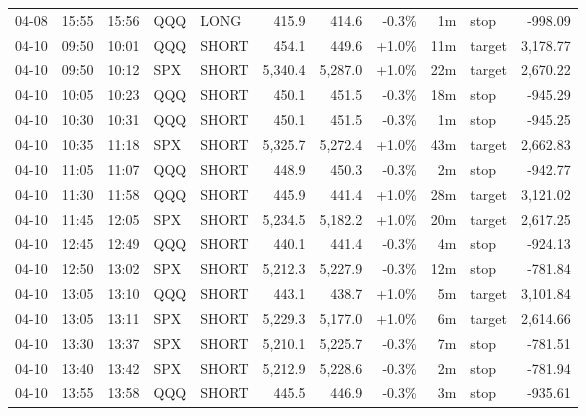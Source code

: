 \documentclass[11pt,a4paper,twoside]{article}
\begin{document}
\begin{center}
\begin{longtable}{>{\color{txtmain}}l l l l l r r r r >{\color{txtmain}}l r}
04-08 & 15:55 & 15:56 & QQQ & LONG & 415.9 & 414.6 & \textcolor{lossred}{-0.3\%} & 1m & stop & \textcolor{lossred}{-998.09} \\
04-10 & 09:50 & 10:01 & QQQ & SHORT & 454.1 & 449.6 & \textcolor{wingreen}{+1.0\%} & 11m & target & \textcolor{wingreen}{3,178.77} \\
04-10 & 09:50 & 10:12 & SPX & SHORT & 5,340.4 & 5,287.0 & \textcolor{wingreen}{+1.0\%} & 22m & target & \textcolor{wingreen}{2,670.22} \\
04-10 & 10:05 & 10:23 & QQQ & SHORT & 450.1 & 451.5 & \textcolor{lossred}{-0.3\%} & 18m & stop & \textcolor{lossred}{-945.29} \\
04-10 & 10:30 & 10:31 & QQQ & SHORT & 450.1 & 451.5 & \textcolor{lossred}{-0.3\%} & 1m & stop & \textcolor{lossred}{-945.25} \\
04-10 & 10:35 & 11:18 & SPX & SHORT & 5,325.7 & 5,272.4 & \textcolor{wingreen}{+1.0\%} & 43m & target & \textcolor{wingreen}{2,662.83} \\
04-10 & 11:05 & 11:07 & QQQ & SHORT & 448.9 & 450.3 & \textcolor{lossred}{-0.3\%} & 2m & stop & \textcolor{lossred}{-942.77} \\
04-10 & 11:30 & 11:58 & QQQ & SHORT & 445.9 & 441.4 & \textcolor{wingreen}{+1.0\%} & 28m & target & \textcolor{wingreen}{3,121.02} \\
04-10 & 11:45 & 12:05 & SPX & SHORT & 5,234.5 & 5,182.2 & \textcolor{wingreen}{+1.0\%} & 20m & target & \textcolor{wingreen}{2,617.25} \\
04-10 & 12:45 & 12:49 & QQQ & SHORT & 440.1 & 441.4 & \textcolor{lossred}{-0.3\%} & 4m & stop & \textcolor{lossred}{-924.13} \\
04-10 & 12:50 & 13:02 & SPX & SHORT & 5,212.3 & 5,227.9 & \textcolor{lossred}{-0.3\%} & 12m & stop & \textcolor{lossred}{-781.84} \\
04-10 & 13:05 & 13:10 & QQQ & SHORT & 443.1 & 438.7 & \textcolor{wingreen}{+1.0\%} & 5m & target & \textcolor{wingreen}{3,101.84} \\
04-10 & 13:05 & 13:11 & SPX & SHORT & 5,229.3 & 5,177.0 & \textcolor{wingreen}{+1.0\%} & 6m & target & \textcolor{wingreen}{2,614.66} \\
04-10 & 13:30 & 13:37 & SPX & SHORT & 5,210.1 & 5,225.7 & \textcolor{lossred}{-0.3\%} & 7m & stop & \textcolor{lossred}{-781.51} \\
04-10 & 13:40 & 13:42 & SPX & SHORT & 5,212.9 & 5,228.6 & \textcolor{lossred}{-0.3\%} & 2m & stop & \textcolor{lossred}{-781.94} \\
04-10 & 13:55 & 13:58 & QQQ & SHORT & 445.5 & 446.9 & \textcolor{lossred}{-0.3\%} & 3m & stop & \textcolor{lossred}{-935.61} \\

\end{longtable}
\end{center}
\end{document}
